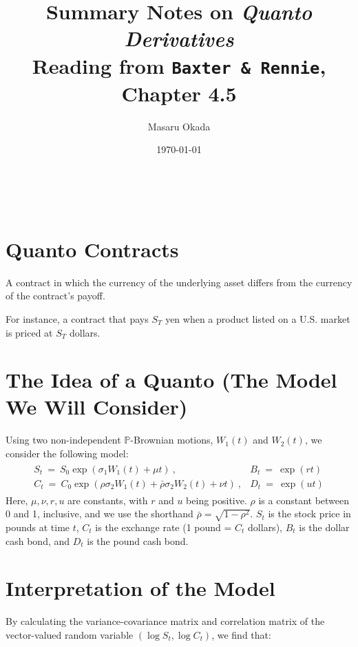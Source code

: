 \documentclass[uplatex,a4j,12pt,dvipdfmx]{jsarticle}
\title{
    Summary Notes on \textit{Quanto Derivatives} \\
    \normalsize Reading from \texttt{Baxter \& Rennie}, Chapter 4.5
}
\author{Masaru Okada}
\date{\today}
\begin{document}
\maketitle

\tableofcontents

\ \\
\section{Quanto Contracts}

A contract in which the currency of the underlying asset differs from the currency of the contract's payoff.

For instance, a contract that pays $S_{T}$ yen when a product listed on a U.S. market is priced at $S_{T}$ dollars.

\section{The Idea of a Quanto (The Model We Will Consider)}

Using two non-independent $\mathbb{P}$-Brownian motions, $W_{1}(t)$ and $W_{2}(t)$, we consider the following model:
%
%
\begin{eqnarray}
	\left.
	\begin{array}{ll}
		S_{t}
		\ = \
		S_{0}
		\exp \left( \sigma_{1} W_{1}(t) + \mu t \right) \ ,
		 &
		B_{t}
		\ = \
		\exp (rt)
		\\
		C_{t}
		\ = \
		C_{0}
		\exp \left(
		\rho \sigma_{2} W_{1}(t) +
		\bar{\rho} \sigma_{2} W_{2}(t) + \nu t \right)\ ,
		 &
		D_{t}
		\ = \
		\exp (ut)
	\end{array}
	\right.
\end{eqnarray}
%
%
Here, $\mu, \nu, r, u$ are constants, with $r$ and $u$ being positive.
$\rho$ is a constant between 0 and 1, inclusive,
and we use the shorthand $\bar{\rho} = \sqrt{1 - \rho^{2}}$.
$S_{t}$ is the stock price in pounds at time $t$,
$C_{t}$ is the exchange rate (1 pound = $C_{t}$ dollars),
$B_{t}$ is the dollar cash bond,
and $D_{t}$ is the pound cash bond.

\section{Interpretation of the Model}

By calculating the variance-covariance matrix and correlation matrix of the vector-valued random variable
$( \log S_{t} , \log C_{t})$,
we find that:
\end{document}
